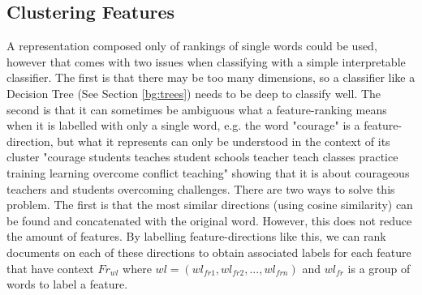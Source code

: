 \subsection{Clustering Features}\label{ch3:LabellingWords}
A representation composed only of rankings of single words could be used, however that comes with two issues when classifying with a simple interpretable classifier. The first is that there may be too many dimensions, so a  classifier like a Decision Tree (See Section \ref{bg:trees})  needs to be deep to classify well. The second is that it can sometimes be ambiguous what a feature-ranking means when it is labelled with only a single word, e.g. the word "courage" is a feature-direction, but what it represents can only be understood in the context of its cluster "courage students teaches student schools teacher teach classes practice training learning overcome conflict teaching" showing that it is about courageous teachers and students overcoming challenges. There are two ways to solve this problem. The first is that the most similar directions (using cosine similarity) can be found and concatenated with the original word. However, this does not reduce the amount of features. By labelling feature-directions like this, we can rank documents on each of these directions to obtain  associated labels for each feature that have context ${Fr}_{wl}$ where ${wl} = ({wl}_{fr1}, {wl}_{fr2}, ..., {wl}_{frn})$ and ${wl}_{fr}$ is a group of words to label a feature.

